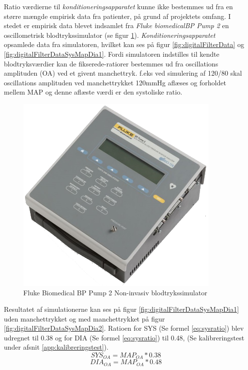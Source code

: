 \begin{minipage}[c]{0.5\textwidth}
	Ratio værdierne til \textit{konditioneringsapparatet} kunne ikke bestemmes ud fra en større mængde empirisk data fra patienter, på grund af projektets omfang. I stedet er empirisk data blevet indsamlet fra\textit{ Fluke biomedicalBP Pump 2} en oscillometrisk blodtrykssimulator (se figur \ref{fig:TheFlukeBiomedicalBPPump2L}). \textit{Konditioneringsapparatet} opsamlede data fra simulatoren, hvilket kan ses på figur \ref{fig:digitalFilterData} og \ref{fig:digitalFilterDataSysMapDia1}. Fordi simulatoren indstilles til kendte blodtryksværdier kan de fikserede-ratiorer bestemmes ud fra oscillations amplituden (OA) ved et givent manchettryk. f.eks ved simulering af 120/80 skal oscillations amplituden ved manchettrykket 120mmHg aflæses og forholdet mellem MAP og denne aflæste værdi er den systoliske ratio.
	
	
\end{minipage}
\begin{minipage}[c]{0.5\textwidth}
	\begin{figure}[H]
		\centering
		\includegraphics[trim={0 0 0 0},clip, width=0.9\textwidth]{billeder/TheFlukeBiomedicalBPPump2L.png}	
		\parbox{7cm}{\caption{Fluke Biomedical BP Pump 2 Non-invasiv blodtrykssimulator}\label{fig:TheFlukeBiomedicalBPPump2L}}
	\end{figure}
\end{minipage}

Resultatet af simulationerne kan ses på figur \ref{fig:digitalFilterDataSysMapDia1} uden manchettrykket og med manchettrykket på figur \ref{fig:digitalFilterDataSysMapDia2}. Ratioen for SYS (Se formel \ref{eq:sysratio}) blev udregnet til 0.38 og for DIA (Se formel \ref{eq:sysratio}) til 0.48, (Se kalibreringstest under afsnit \ref{app:kalibreringstest}). 
	\begin{equation}
	SYS_{OA}=MAP_{OA}*0.38
	\label{eq:sysratio}
	\end{equation}
	\begin{equation}
	DIA_{OA}=MAP_{OA}*0.48
	\label{eq:diaratio}
	\end{equation}


